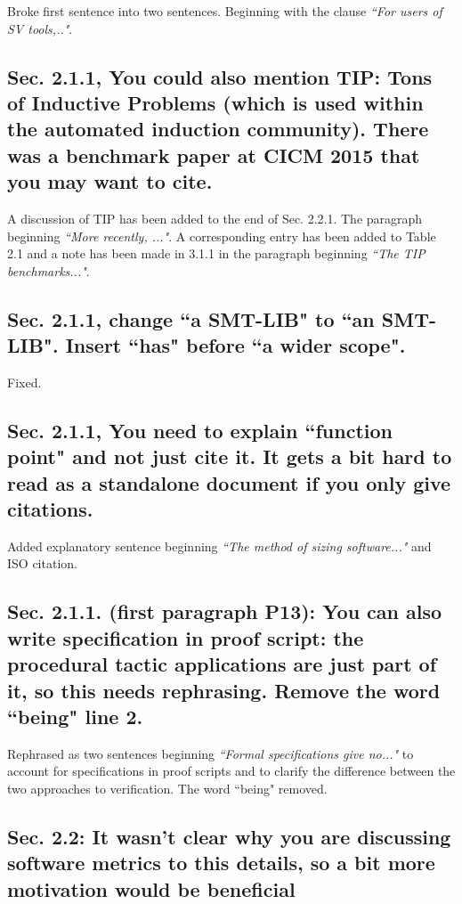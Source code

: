 \documentclass[]{article}
\begin{document}
Broke first sentence into two sentences. Beginning with the clause \emph{``For users of SV tools,.."}.

\subsection{Sec. 2.1.1, You could also mention TIP: Tons of Inductive Problems (which is used within the automated induction community). There was a benchmark paper at CICM 2015 that you may want to cite.}

A discussion of TIP has been added to the end of Sec. 2.2.1. The paragraph beginning \emph{``More recently, ..."}. A corresponding entry has been added to Table 2.1 and a note has been made in 3.1.1 in the paragraph beginning \emph{``The TIP benchmarks..."}.

\subsection{Sec. 2.1.1, change ``a SMT-LIB" to ``an SMT-LIB". Insert ``has" before ``a wider scope".}

Fixed.

\subsection{Sec. 2.1.1, You need to explain ``function point" and not just cite it. It gets a bit hard to read as a standalone document if you only give citations.}

Added explanatory sentence beginning \emph{``The method of sizing software..."} and ISO citation. 

\subsection{Sec. 2.1.1. (first paragraph P13): You can also write specification in proof script: the procedural tactic applications are just part of it, so this needs rephrasing. Remove the word ``being" line 2.} 

Rephrased as two sentences beginning \emph{``Formal specifications give no..."} to account for specifications in proof scripts and to clarify the difference between the two approaches to verification.
The word ``being" removed.
	
\subsection{Sec. 2.2: It wasn't clear why you are discussing software metrics to this details, so a bit more motivation would be beneficial}
\end{document}
